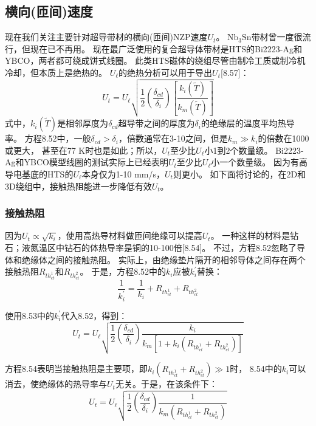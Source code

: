 \subsection{横向(匝间)速度}
现在我们关注主要针对超导带材的横向(匝间)NZP速度$U_t$。
$\mathrm{Nb_3Sn}$带材曾一度很流行，但现在已不再用。
现在最广泛使用的复合超导体带材是HTS的Bi2223-Ag和YBCO，两者都可绕成饼式线圈。
此类HTS磁体的绕组尽管由制冷工质或制冷机冷却，但本质上是绝热的。
$U_\ell$的绝热分析可以用于导出$U_t$[8.57]：
\begin{equation}%
U_t=U_\ell\sqrt{\frac{1}{2}\left(\frac{\delta_{cd}}{\delta_i}\right)\left[\frac{k_i(\tilde{T})}{k_m(\tilde{T})}\right]}
\end{equation}
式中，$k_i(\tilde{T})$是相邻厚度为$\delta_{cd}$超导带之间的厚度为$\delta_i$的绝缘层的温度平均热导率。
方程8.52中，一般$\delta_{cd}>\delta_i$，倍数通常在3-10之间，但是$k_m\gg k_i$的倍数在1000或更大，
甚至在77 K时也是如此；所以，$U_t$至少比$U_\ell$小1到2个数量级。
Bi2223-Ag和YBCO模型线圈的测试实际上已经表明$U_t$至少比$U_\ell$小一个数量级。
因为有高导电基底的HTS的$U_\ell$本身仅为1-10 mm/s，$U_t$则更小。
如下面将讨论的，在2D和3D绕组中，接触热阻能进一步降低有效$U_t$。

\subsubsection*{接触热阻}
因为$U_t\propto \sqrt{k_i}$，使用高热导材料做匝间绝缘可以提高$U_t$。
一种这样的材料是钻石；液氮温区中钻石的体热导率是铜的10-100倍[8.54]。
不过，方程8.52忽略了导体和绝缘体之间的接触热阻。
实际上，由绝缘垫片隔开的相邻导体之间存在两个接触热阻$R_{th_{ct}^1}$和$R_{th_{ct}^2}$。
于是，方程8.52中的$k_i$应被$k_i^\prime$替换：
\begin{equation}%
\frac{1}{k_{i}^{\prime}}=\frac{1}{k_i}+R_{th_{ct}^{1}}+R_{th_{ct}^{2}}
\end{equation}

使用8.53中的$k_i^\prime$代入8.52，得到：
\begin{equation}%
U_t=U_\ell\sqrt{\frac{1}{2}\left(\frac{\delta_{cd}}{\delta_i}\right)\frac{k_i}{k_m[1+k_i(R_{th_{ct}^{1}}+R_{th_{ct}^{2}})]}}
\end{equation}

方程8.54表明当接触热阻是主要项，即$k_i(R_{th_{ct}^{1}}+R_{th_{ct}^{2}})\gg 1$时，
8.54中的$k_i$可以消去，使绝缘体的热导率与$U_t$无关。于是，在该条件下：
\begin{equation}%
U_t=U_\ell\sqrt{\frac{1}{2}\left(\frac{\delta_{cd}}{\delta_i}\right)\frac{1}{k_m(R_{th_{ct}^{1}}+R_{th_{ct}^{2}})}}
\end{equation}

